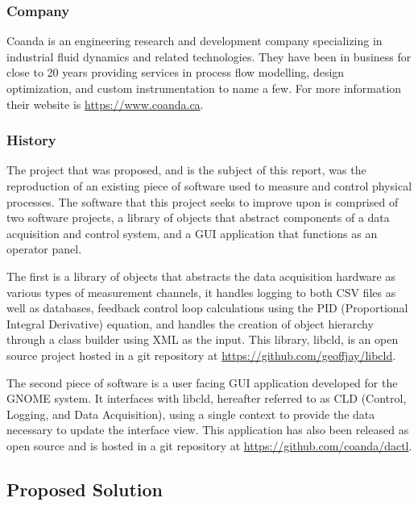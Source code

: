 \documentclass[11pt]{article}
\begin{document}
      \subsubsection{Company}\label{sec:desc-bg-company}

        Coanda is an engineering research and development company specializing in
        industrial fluid dynamics and related technologies. They have been in
        business for close to 20 years providing services in process flow modelling,
        design optimization, and custom instrumentation to name a few. For more
        information their website is \url{https://www.coanda.ca}.

      \subsubsection{History}\label{sec:desc-bg-project}

        The project that was proposed, and is the subject of this report, was the
        reproduction of an existing piece of software used to measure and control
        physical processes. The software that this project seeks to improve upon
        is comprised of two software projects, a library of objects that abstract
        components of a data acquisition and control system, and a GUI application
        that functions as an operator panel.

        The first is a library of objects
        that abstracts the data acquisition hardware as various types of measurement
        channels, it handles logging to both CSV files as well as databases,
        feedback control loop calculations using the PID (Proportional
        Integral Derivative) equation, and handles the creation of object hierarchy
        through a class builder using XML as the input. This library, libcld, is an
        open source project hosted in a git repository at
        \url{https://github.com/geoffjay/libcld}.

        The second piece of software is a user facing GUI application developed for
        the GNOME system. It interfaces with libcld, hereafter referred to as
        CLD (Control, Logging, and Data Acquisition), using a single context to
        provide the data necessary to update the interface view. This application
        has also been released as open source and is hosted in a git repository
        at \url{https://github.com/coanda/dactl}.

    \subsection{Proposed Solution}\label{sec:desc-soln}
\end{document}
